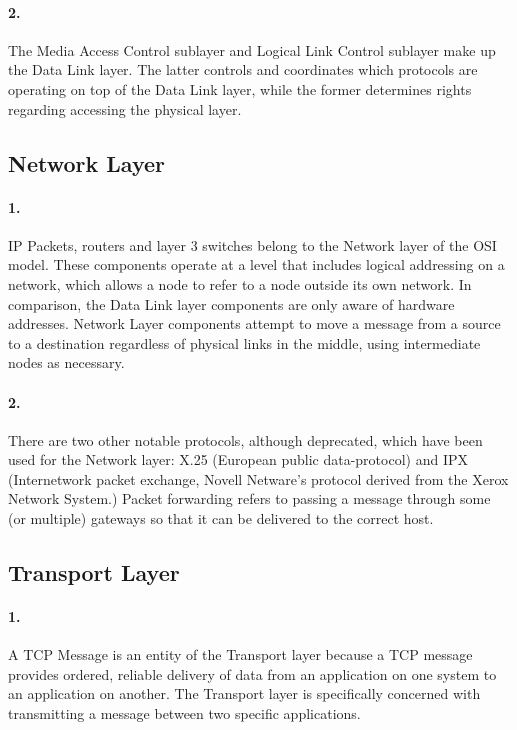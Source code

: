 \documentclass[11pt]{article}
\begin{document}
\paragraph{2.}
The Media Access Control sublayer and Logical Link Control sublayer make up the Data Link layer. The latter controls and coordinates which protocols are operating on top of the Data Link layer, while the former determines rights regarding accessing the physical layer. 

\subsection{Network Layer}
\paragraph{1.}
IP Packets, routers and layer 3 switches belong to the Network layer of the OSI model. These components operate at a level that includes logical addressing on a network, which allows a node to refer to a node outside its own network. In comparison, the Data Link layer components are only aware of hardware addresses. Network Layer components attempt to move a message from a source to a destination regardless of physical links in the middle, using intermediate nodes as necessary.
\paragraph{2.}
There are two other notable protocols, although deprecated, which have been used for the Network layer: X.25 (European public data-protocol) and IPX (Internetwork packet exchange, Novell Netware's protocol derived from the Xerox Network System.) Packet forwarding refers to passing a message through some (or multiple) gateways so that it can be delivered to the correct host.

\pagebreak

\subsection{Transport Layer}
\paragraph{1.}
A TCP Message is an entity of the Transport layer because a TCP message provides ordered, reliable delivery of data from an application on one system to an application on another. The Transport layer is specifically concerned with transmitting a message between two specific applications.
\end{document}
